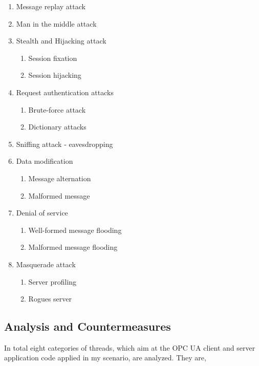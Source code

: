 \begin{enumerate}
	\item Message replay attack
	\item Man in the middle attack
	\item Stealth and Hijacking attack
  	\begin{enumerate}
    	\item Session fixation
	\item Session hijacking
	\end{enumerate}
		
    	\item Request authentication attacks
	\begin{enumerate}
		\item Brute-force attack
		\item Dictionary attacks
		\end{enumerate}
    	\item  Sniffing attack - eavesdropping

	\item Data modification
		\begin{enumerate}
		\item Message alternation
		\item Malformed message
		\end{enumerate}
	
	\item Denial of service
		\begin{enumerate}
		\item Well-formed message flooding
		\item Malformed message flooding
		\end{enumerate}

	\item Masquerade attack
		\begin{enumerate}
		\item Server profiling
		\item Rogues server
		\end{enumerate}
\end{enumerate}
\subsection{Analysis and Countermeasures}
In total eight categories of threads, which aim at the OPC UA client and server application code applied in my scenario, are analyzed. They are,

